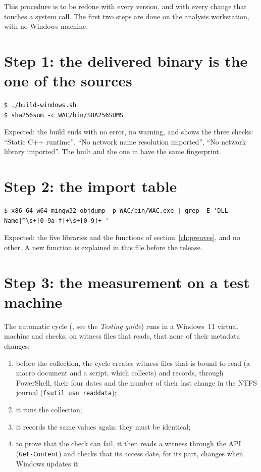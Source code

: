 \documentclass[11pt,a4paper,oneside]{report}
\begin{document}
This procedure is to be redone with every version, and with every change that
touches a system call. The first two steps are done on the analysis
workstation, with no Windows machine.

\section{Step 1: the delivered binary is the one of the sources}

\begin{lstlisting}
$ ./build-windows.sh
$ sha256sum -c WAC/bin/SHA256SUMS
\end{lstlisting}

Expected: the build ends with no error, no warning, and shows the three
checks: ``Static C++ runtime'', ``No network name resolution imported'', ``No
network library imported''. The  built and the one in
 have the same fingerprint.

\section{Step 2: the import table}

\begin{lstlisting}
$ x86_64-w64-mingw32-objdump -p WAC/bin/WAC.exe | grep -E 'DLL Name|^\s+[0-9a-f]+\s+[0-9]+ '
\end{lstlisting}

Expected: the five libraries and the functions of
section~\ref{ch:preuves}, and no other. A new function is explained in this
file before the release.

\section{Step 3: the measurement on a test machine}

The automatic cycle (, see the \emph{Testing
guide}) runs \wac{} in a Windows~11 virtual machine and checks, on witness
files that \wac{} reads, that none of their metadata changes:

\begin{enumerate}
  \item before the collection, the cycle creates witness files that \wac{} is
        bound to read (a macro document and a script, which 
        collects) and records, through PowerShell, their four dates and the
        number of their last change in the NTFS journal
        (\texttt{fsutil usn readdata});
  \item it runs the collection;
  \item it records the same values again: they must be identical;
  \item to prove that the check can fail, it then reads a witness through the
        API (\texttt{Get-Content}) and checks that its access date, for its
        part, changes when Windows updates it.
\end{enumerate}
\end{document}
